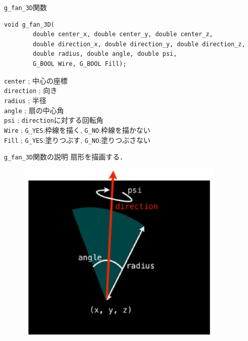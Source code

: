 \documentclass[platex,a4paper,12pt]{jsarticle}%
\begin{document}
\begin{itembox}[l]{\texttt{g\_fan\_3D}関数}
\begin{verbatim}
void g_fan_3D(
        double center_x, double center_y, double center_z,
        double direction_x, double direction_y, double direction_z,
        double radius, double angle, double psi,
        G_BOOL Wire, G_BOOL Fill);
\end{verbatim}
\verb|center| ; 中心の座標\\
\verb|direction| ; 向き\\
\verb|radius| ; 半径\\
\verb|angle| ; 扇の中心角\\
\verb|psi| ; \verb|direction|に対する回転角\\
\verb|Wire| ; \verb|G_YES|:枠線を描く, \verb|G_NO|:枠線を描かない \\
\verb|Fill| ; \verb|G_YES|:塗りつぶす, \verb|G_NO|:塗りつぶさない 
\end{itembox}

\begin{itembox}[l]{\texttt{g\_fan\_3D}関数の説明}
扇形を描画する．
\end{itembox}
\begin{figure}[htb]
\centering
	\includegraphics[width=100mm]{Canvas_g_fan.eps}
\end{figure}

\end{document}
